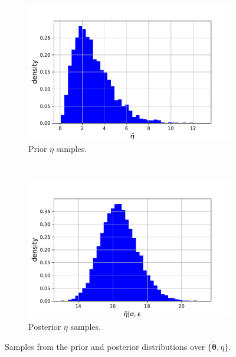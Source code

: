\documentclass{article}
\begin{document}
\begin{figure}[htb!]
		\begin{subfigure}[b]{0.45\textwidth}
			\centering
			\includegraphics[width=\textwidth]{Q3a_4.pdf}
			\caption{Prior $\eta$ samples.}
		\end{subfigure}
		~
		\begin{subfigure}[b]{0.45\textwidth}
			\centering
			\includegraphics[width=\textwidth]{Q3a_9.pdf}
			\caption{Posterior $\eta$ samples.}
		\end{subfigure}
		
		\caption{Samples from the prior and posterior distributions over $\{\tilde{\boldsymbol\theta}, \eta\}$.}
		\label{fig:Q3_pymc3_prior_post_samples}
	\end{figure}
\end{document}
